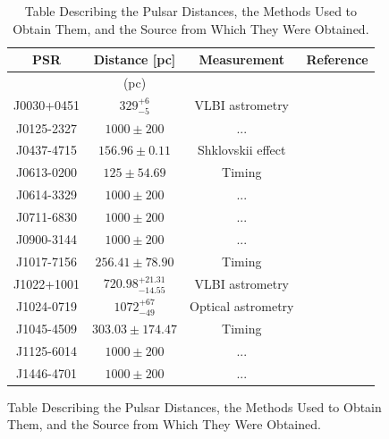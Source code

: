 \begin{figure}[h]
\begin{table}[]
\renewcommand{\arraystretch}{1.3}
\centering
\caption{Table Describing the Pulsar Distances, the Methods Used to Obtain Them, and the Source from Which They Were Obtained.}
\begin{tabular}{cccc}
\hline
PSR & Distance [pc]                     & Measurement             & Reference \\ \hline
 & (pc)                     &              & \\ \hline \hline
J0030+0451  & $329^{+6}_{-5}$               & VLBI astrometry                   & \citet{DingDeller2023}       \\
J0125-2327  & $1000 \pm 200$                 & ...                                 & \citet{EllisVanHaasteren2017}       \\
J0437-4715  & $156.96\pm0.11$               & Shklovskii effect                 & \citet{Shklovskii1970, ReardonBailes2024}       \\
J0613-0200  & $125\pm54.69$                 & Timing                            & \citet{VerbiestBailes2009}       \\
J0614-3329  & $1000 \pm 200$                 & ...                                 & \citet{EllisVanHaasteren2017}       \\
J0711-6830  & $1000 \pm 200$                 & ...                                 & \citet{EllisVanHaasteren2017}       \\
J0900-3144  & $1000 \pm 200$                 & ...                                 & \citet{EllisVanHaasteren2017}       \\
J1017-7156  & $256.41\pm78.90$              & Timing                            & \citet{NgBailes2014}       \\
J1022+1001  & $720.98^{+21.31}_{-14.55}$    & VLBI astrometry                   & \citet{DellerGoss2019}       \\
J1024-0719  & $1072^{+67}_{-49}$            & Optical astrometry                & \citet{MoranMingarelli2023}       \\
J1045-4509  & $303.03\pm 174.47$            & Timing                            & \citet{VerbiestBailes2009}       \\
J1125-6014  & $1000 \pm 200$                 & ...                                 & \citet{EllisVanHaasteren2017}       \\
J1446-4701  & $1000 \pm 200$                 & ...                                 & \citet{EllisVanHaasteren2017}       \\

\end{tabular}
\end{table}
\end{figure}
